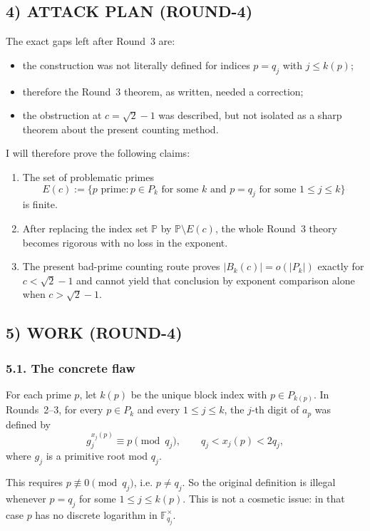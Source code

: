 \subsection*{4) ATTACK PLAN (ROUND-4)}
The exact gaps left after Round~3 are:
\begin{itemize}
\item the construction was not literally defined for indices $p=q_j$ with $j\le k(p)$;
\item therefore the Round~3 theorem, as written, needed a correction;
\item the obstruction at $c=\sqrt2-1$ was described, but not isolated as a sharp theorem about the present counting method.
\end{itemize}

I will therefore prove the following claims:
\begin{enumerate}
\item The set of problematic primes
\[
E(c):=\{p\text{ prime}: p\in P_k\text{ for some }k\text{ and }p=q_j\text{ for some }1\le j\le k\}
\]
is finite.
\item After replacing the index set $\mathbb P$ by $\mathbb P\setminus E(c)$, the whole Round~3 theory becomes rigorous with no loss in the exponent.
\item The present bad-prime counting route proves $|B_k(c)|=o(|P_k|)$ exactly for $c<\sqrt2-1$ and cannot yield that conclusion by exponent comparison alone when $c>\sqrt2-1$.
\end{enumerate}

\subsection*{5) WORK (ROUND-4)}

\subsubsection*{5.1. The concrete flaw}
For each prime $p$, let $k(p)$ be the unique block index with $p\in P_{k(p)}$.
In Rounds~2--3, for every $p\in P_k$ and every $1\le j\le k$, the $j$-th digit of $a_p$ was defined by
\[
g_j^{x_j(p)}\equiv p \pmod{q_j},
\qquad q_j< x_j(p)<2q_j,
\]
where $g_j$ is a primitive root mod $q_j$.

This requires $p\not\equiv 0\pmod{q_j}$, i.e. $p\neq q_j$.
So the original definition is illegal whenever $p=q_j$ for some $1\le j\le k(p)$.
This is not a cosmetic issue: in that case $p$ has no discrete logarithm in $\mathbb F_{q_j}^{\times}$.

